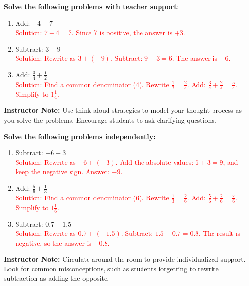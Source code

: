 \documentclass[12pt]{article}
\begin{document}
\begin{tcolorbox}[colframe=black!60, colback=white, 
coltitle=black, colbacktitle=black!15, fonttitle=\bfseries\Large, 
title=Guided Practice, halign title=center, left=10pt, right=10pt, top=10pt, bottom=15pt]
\textbf{Solve the following problems with teacher support:}
\begin{enumerate}[itemsep=5em] %
    \item Add: \( -4 + 7 \) \\
    \textcolor{red}{Solution: \( 7 - 4 = 3 \). Since 7 is positive, the answer is \( +3 \).}
    \item Subtract: \( 3 - 9 \) \\
    \textcolor{red}{Solution: Rewrite as \( 3 + (-9) \). Subtract: \( 9 - 3 = 6 \). The answer is \( -6 \).}
    \item Add: \( \frac{3}{4} + \frac{1}{2} \) \\
    \textcolor{red}{Solution: Find a common denominator (4). Rewrite \( \frac{1}{2} = \frac{2}{4} \). Add: \( \frac{3}{4} + \frac{2}{4} = \frac{5}{4} \). Simplify to \( 1\frac{1}{4} \).}
\end{enumerate}

{\color{blue} \textbf{Instructor Note:} Use think-aloud strategies to model your thought process as you solve the problems. Encourage students to ask clarifying questions.}
\end{tcolorbox}

\vspace{1em}

\begin{tcolorbox}[colframe=black!60, colback=white, 
coltitle=black, colbacktitle=black!15, fonttitle=\bfseries\Large, 
title=Independent Practice, halign title=center, left=10pt, right=10pt, top=10pt, bottom=15pt]
\textbf{Solve the following problems independently:}
\begin{enumerate}[itemsep=5em] %
    \item Subtract: \( -6 - 3 \) \\
    \textcolor{red}{Solution: Rewrite as \( -6 + (-3) \). Add the absolute values: \( 6 + 3 = 9 \), and keep the negative sign. Answer: \( -9 \).}
    \item Add: \( \frac{5}{6} + \frac{1}{3} \) \\
    \textcolor{red}{Solution: Find a common denominator (6). Rewrite \( \frac{1}{3} = \frac{2}{6} \). Add: \( \frac{5}{6} + \frac{2}{6} = \frac{7}{6} \). Simplify to \( 1\frac{1}{6} \).}
    \item Subtract: \( 0.7 - 1.5 \) \\
    \textcolor{red}{Solution: Rewrite as \( 0.7 + (-1.5) \). Subtract: \( 1.5 - 0.7 = 0.8 \). The result is negative, so the answer is \( -0.8 \).}
\end{enumerate}

{\color{blue} \textbf{Instructor Note:} Circulate around the room to provide individualized support. Look for common misconceptions, such as students forgetting to rewrite subtraction as adding the opposite.}
\end{tcolorbox}
\end{document}
